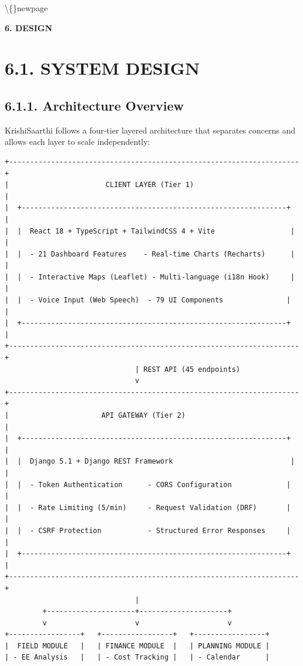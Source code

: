 \documentclass[12pt, a4paper]{report}
\begin{document}
\textbackslash\{\}newpage

\begin{center}
{\fontsize{14}{17}\bfseries 6. DESIGN}\\
\end{center}
\section{6.1. SYSTEM DESIGN}
\subsection{6.1.1. Architecture Overview}
KrishiSaarthi follows a four-tier layered architecture that separates concerns and allows each layer to scale independently:

\begin{Verbatim}[fontsize=\small]
+---------------------------------------------------------------------+
|                       CLIENT LAYER (Tier 1)                          |
|  +---------------------------------------------------------------+  |
|  |  React 18 + TypeScript + TailwindCSS 4 + Vite                  |  |
|  |  - 21 Dashboard Features    - Real-time Charts (Recharts)      |  |
|  |  - Interactive Maps (Leaflet) - Multi-language (i18n Hook)     |  |
|  |  - Voice Input (Web Speech)  - 79 UI Components               |  |
|  +---------------------------------------------------------------+  |
+---------------------------------------------------------------------+
                               | REST API (45 endpoints)
                               v
+---------------------------------------------------------------------+
|                      API GATEWAY (Tier 2)                            |
|  +---------------------------------------------------------------+  |
|  |  Django 5.1 + Django REST Framework                            |  |
|  |  - Token Authentication      - CORS Configuration             |  |
|  |  - Rate Limiting (5/min)     - Request Validation (DRF)       |  |
|  |  - CSRF Protection           - Structured Error Responses     |  |
|  +---------------------------------------------------------------+  |
+---------------------------------------------------------------------+
                               |
         +---------------------+---------------------+
         v                     v                     v
+-----------------+   +-----------------+   +-----------------+
|  FIELD MODULE   |   | FINANCE MODULE  |   | PLANNING MODULE |
| - EE Analysis   |   | - Cost Tracking |   | - Calendar      |

\end{Verbatim}
\end{document}
